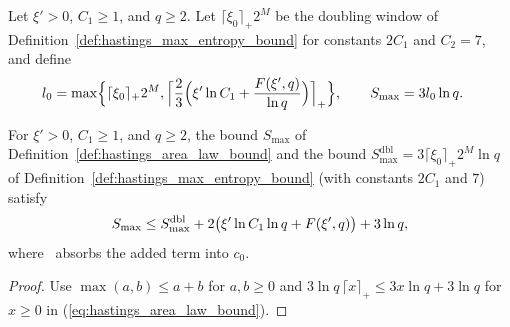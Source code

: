 \begin{definition}
    \label{def:hastings_area_law_bound}
    \leanok
    Let $\xi'>0$, $C_1\ge1$, and $q\ge2$. Let $\lceil\xi_0\rceil_+2^M$ be the
    doubling window of Definition~\ref{def:hastings_max_entropy_bound} for
    constants $2C_1$ and $C_2=7$, and define
    \begin{align}
        l_0 & =\max\Bigl\{\lceil\xi_0\rceil_+2^M,
        \Bigl\lceil\frac23\Bigl(\xi'\ln C_1+\frac{F(\xi',q)}{\ln q}\Bigr)
        \Bigr\rceil_+\Bigr\},                          \qquad
        S_{\max} =3l_0\ln q .
        \label{eq:hastings_area_law_bound}
    \end{align}
\end{definition}

\begin{lemma}
    \label{thm:hastings_area_law_bound_le}
    \leanok
    For $\xi'>0$, $C_1\ge1$, and $q\ge2$, the bound $S_{\max}$ of
    Definition~\ref{def:hastings_area_law_bound} and the bound
    $S_{\max}^{\mathrm{dbl}}=3\lceil\xi_0\rceil_+2^M\ln q$ of
    Definition~\ref{def:hastings_max_entropy_bound} (with constants $2C_1$ and
    $7$) satisfy
    \begin{align}
        S_{\max}\le S_{\max}^{\mathrm{dbl}}+2\bigl(\xi'\ln C_1\ln q+F(\xi',q)\bigr)+3\ln q,
        \notag
    \end{align}
    where~\cite[lines 483--486]{Hastings2007AreaLaw} absorbs the added term into
    $c_0$.
\end{lemma}
\begin{proof}\leanok
    Use $\max(a,b)\le a+b$ for $a,b\ge0$ and
    $3\ln q\,\lceil x\rceil_+\le 3x\ln q+3\ln q$ for $x\ge0$ in
    (\ref{eq:hastings_area_law_bound}).
\end{proof}

